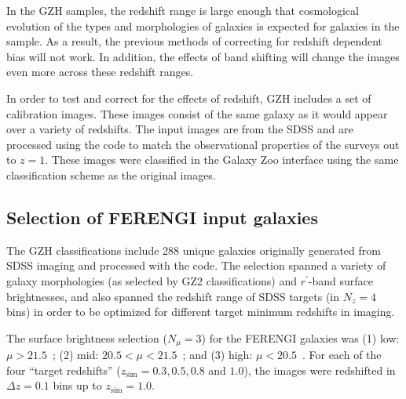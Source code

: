 \documentclass[twocolumn]{aastex6}
\begin{document}
In the GZH samples, the redshift range is large enough that cosmological evolution of the types and morphologies of galaxies is expected for galaxies in the sample. As a result, the previous methods of correcting for redshift dependent bias will not work. In addition, the effects of band shifting will change the images even more across these redshift ranges. %

In order to test and correct for the effects of redshift, GZH includes a set of calibration images. These images consist of the same galaxy as it would appear over a variety of redshifts. The input images are from the SDSS \citep{yor00,str02} and are processed using the \ferengi{} code \citep{bar08a} to match the observational properties of the \hst{} surveys out to $z=1$. These images were classified in the Galaxy Zoo interface using the same classification scheme as the original \hst{} images.
 
\subsection{Selection of FERENGI input galaxies}

The GZH classifications include 288 unique galaxies originally generated from SDSS imaging and processed with the \ferengi{} code. The selection spanned a variety of galaxy morphologies (as selected by GZ2 classifications) and $r^\prime$-band surface brightnesses, and also spanned the redshift range of SDSS targets (in $N_z = 4$ bins) in order to be optimized for different target minimum redshifts in \hst{} imaging. 

The surface brightness selection ($N_\mu = 3$) for the FERENGI galaxies was (1) low: $\mu > 21.5$~\magarc;  (2) mid: $20.5 < \mu < 21.5$~\magarc; and (3) high: $\mu < 20.5$~\magarc. For each of the four ``target redshifts'' ($z_\mathrm{sim} = 0.3, 0.5, 0.8$ and $1.0$), the images were redshifted in $\Delta z = 0.1$ bins up to $z_\mathrm{sim}=1.0$. 
 
\end{document}
